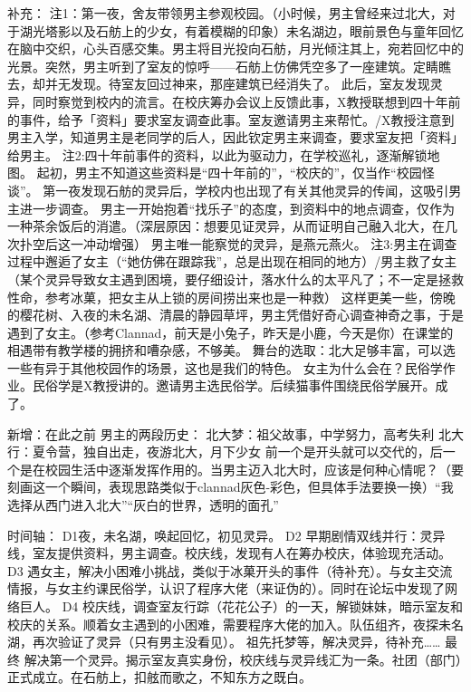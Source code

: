 补充：
注1：第一夜，舍友带领男主参观校园。（小时候，男主曾经来过北大，对于湖光塔影以及石舫上的少女，有着模糊的印象）未名湖边，眼前景色与童年回忆在脑中交织，心头百感交集。男主将目光投向石舫，月光倾注其上，宛若回忆中的光景。突然，男主听到了室友的惊呼——石舫上仿佛凭空多了一座建筑。定睛瞧去，却并无发现。待室友回过神来，那座建筑已经消失了。
此后，室友发现灵异，同时察觉到校内的流言。在校庆筹办会议上反馈此事，X教授联想到四十年前的事件，给予「资料」要求室友调查此事。室友邀请男主来帮忙。/X教授注意到男主入学，知道男主是老同学的后人，因此钦定男主来调查，要求室友把「资料」给男主。
注2:四十年前事件的资料，以此为驱动力，在学校巡礼，逐渐解锁地图。
起初，男主不知道这些资料是“四十年前的”，“校庆的”，仅当作“校园怪谈”。
第一夜发现石舫的灵异后，学校内也出现了有关其他灵异的传闻，这吸引男主进一步调查。
男主一开始抱着“找乐子”的态度，到资料中的地点调查，仅作为一种茶余饭后的消遣。（深层原因：想要见证灵异，从而证明自己融入北大，在几次扑空后这一冲动增强）
男主唯一能察觉的灵异，是燕元燕火。
注3:男主在调查过程中邂逅了女主（“她仿佛在跟踪我”，总是出现在相同的地方）/男主救了女主（某个灵异导致女主遇到困境，要仔细设计，落水什么的太平凡了；不一定是拯救性命，参考冰菓，把女主从上锁的房间捞出来也是一种救）
这样更美一些，傍晚的樱花树、入夜的未名湖、清晨的静园草坪，男主凭借好奇心调查神奇之事，于是遇到了女主。（参考Clannad，前天是小兔子，昨天是小鹿，今天是你）在课堂的相遇带有教学楼的拥挤和嘈杂感，不够美。
舞台的选取：北大足够丰富，可以选一些有异于其他校园作的场景，这也是我们的特色。
女主为什么会在？民俗学作业。民俗学是X教授讲的。邀请男主选民俗学。后续猫事件围绕民俗学展开。成了。

新增：在此之前
男主的两段历史：
北大梦：祖父故事，中学努力，高考失利
北大行：夏令营，独自出走，夜游北大，月下少女
前一个是开头就可以交代的，后一个是在校园生活中逐渐发挥作用的。当男主迈入北大时，应该是何种心情呢？（要刻画这一个瞬间，表现思路类似于clannad灰色-彩色，但具体手法要换一换）“我选择从西门进入北大”“灰白的世界，透明的面孔”


时间轴：
D1夜，未名湖，唤起回忆，初见灵异。
D2 早期剧情双线并行：灵异线，室友提供资料，男主调查。校庆线，发现有人在筹办校庆，体验现充活动。
D3 遇女主，解决小困难小挑战，类似于冰菓开头的事件（待补充）。与女主交流情报，与女主约课民俗学，认识了程序大佬（来证伪的）。同时在论坛中发现了网络巨人。
D4 校庆线，调查室友行踪（花花公子）的一天，解锁妹妹，暗示室友和校庆的关系。顺着女主遇到的小困难，需要程序大佬的加入。队伍组齐，夜探未名湖，再次验证了灵异（只有男主没看见）。
祖先托梦等，解决灵异，待补充……
最终 解决第一个灵异。揭示室友真实身份，校庆线与灵异线汇为一条。社团（部门）正式成立。在石舫上，扣舷而歌之，不知东方之既白。